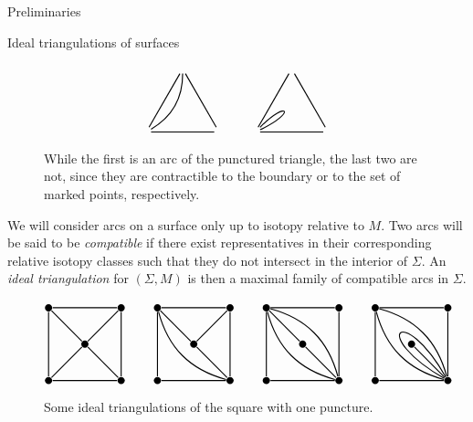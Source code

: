 \begin{chapter}{Preliminaries}
\begin{section}{Ideal triangulations of surfaces}
\begin{figure}[h]
\[\begin{tikzpicture}[thick]
\node (se2) at (3,0) {};
\node (sw2) at (5,0) {}
	edge (se2);
\node (n2) at (4,1.73) {}
	edge (se2)
	edge (sw2)
	edge [bend left] (se2);
\node (c2) at (4,0.7) {};

\node (se3) at (6,0) {}
	edge [in=25, out=45, distance=1.1cm] (se3);
\node (sw3) at (8,0) {}
	edge (se3);
\node (n3) at (7,1.73) {}
	edge (se3)
	edge (sw3);
\node (c3) at (7,0.7) {};
\end{tikzpicture}
\]
\caption{While the first is an arc of the punctured triangle, the last two are not, since they are contractible to the boundary or to the set of marked points, respectively.}
\end{figure}

We will consider arcs on a surface only up to isotopy relative to $M$. Two arcs will be said to be \emph{compatible} if there exist representatives in their corresponding relative isotopy classes such that they do not intersect in the interior of $\Sigma$. An \emph{ideal triangulation} for $(\Sigma, M)$ is then a maximal family of compatible arcs in $\Sigma$.

\begin{figure}[h]
\[
\begin{tikzpicture}[thick]
\tikzstyle{every node} = [circle, fill=black, minimum size=.2cm, inner sep=0cm]
\node (sw1) at (0,0) {};
\node (nw1) at (0,2) {}
	edge (sw1);
\node (se1) at (2,0) {}
	edge (sw1);
\node (ne1) at (2,2) {}
	edge (nw1)
	edge (se1);
\node (c1) at (1,1) {}
	edge (sw1)
	edge (nw1)
	edge (se1)
	edge (ne1);

\node (sw2) at (3,0) {};
\node (nw2) at (3,2) {}
	edge (sw2);
\node (se2) at (5,0) {}
	edge (sw2)
	edge [bend left] (nw2);
\node (ne2) at (5,2) {}
	edge (nw2)
	edge (se2);
\node (c2) at (4,1) {}
	edge (nw2)
	edge (se2)
	edge (ne2);

\node (sw3) at (6,0) {};
\node (nw3) at (6,2) {}
	edge (sw3);
\node (se3) at (8,0) {}
	edge (sw3)
	edge [bend left] (nw3)
	edge [bend right] (nw3);
\node (ne3) at (8,2) {}
	edge (nw3)
	edge (se3);
\node (c3) at (7,1) {}
	edge (nw3)
	edge (se3);

\node (sw4) at (9,0) {};
\node (nw4) at (9,2) {}
	edge (sw4);
\node (se4) at (11,0) {}
	edge (sw4)
	edge [bend left] (nw4)
	edge [bend right] (nw4)
	edge [in=150, out=120,distance=2.4cm] (se4);
\node (ne4) at (11,2) {}
	edge (nw4)
	edge (se4);
\node (c4) at (10,1) {}
	edge (se4);
\end{tikzpicture}
\]
\caption{Some ideal triangulations of the square with one puncture.}
\label{square-triangs}
\end{figure}


\end{section}
\end{chapter}

